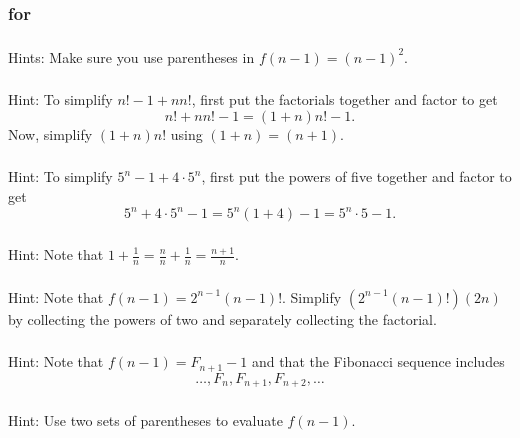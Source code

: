 \subsubsection{\answers for 
\subpffsumproofsind}

\subsubsection*{ \answers}
Hints:  Make sure you use parentheses in $f(n-1)=(n-1)^2$.

\subsubsection*{ \answers}
Hint: To simplify $n!-1+nn!$, first put the factorials together and factor to get $$n!+nn!-1 = (1+n)n!-1.$$  Now, simplify $(1+n)n!$ using $(1+n)=(n+1)$.

\subsubsection*{ \answers}
Hint:  To simplify $5^n-1+4\cdot5^n$, first put the powers of five together and factor to get $$5^n+4\cdot5^n-1 = 5^n(1+4)-1 = 5^n\cdot5 - 1.$$

\subsubsection*{ \answers}
Hint: Note that $\displaystyle 1 + \frac{1}{n}  = \frac{n}{n} + \frac{1}{n}  =\frac{n+1}{n}$.

\subsubsection*{ \answers}
Hint: Note that $f(n-1) = 2^{n-1}(n-1)!$.  Simplify $\left(2^{n-1}(n-1)!\right)(2n)$ by collecting the powers of two and separately collecting the factorial.

\subsubsection*{ \answers}
Hint: Note that $f(n-1) = F_{n+1}-1$ and that the Fibonacci sequence includes $$\ldots, F_n, F_{n+1}, F_{n+2}, \ldots$$

\subsubsection*{ \answers}
Hint: Use two sets of parentheses to evaluate $f(n-1)$.

